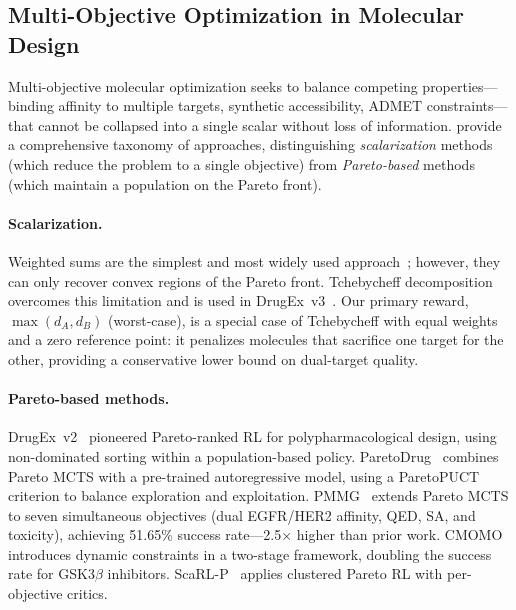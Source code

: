 \subsection{Multi-Objective Optimization in Molecular Design}
\label{sec:rw:moo}

Multi-objective molecular optimization seeks to balance competing
properties---binding affinity to multiple targets, synthetic accessibility,
ADMET constraints---that cannot be collapsed into a single scalar without
loss of information.
\citet{fromer2023moo} provide a comprehensive taxonomy of approaches,
distinguishing \emph{scalarization} methods (which reduce the problem to
a single objective) from \emph{Pareto-based} methods (which maintain a
population on the Pareto front).

\paragraph{Scalarization.}
Weighted sums are the simplest and most widely used
approach~\citep{loeffler2024reinvent4, liu2023drugexv3}; however, they
can only recover convex regions of the Pareto front.
Tchebycheff decomposition~\citep{zhang2007moead} overcomes this limitation
and is used in DrugEx~v3~\citep{liu2023drugexv3}.
Our primary reward, $\max(d_A, d_B)$ (worst-case), is a special case of
Tchebycheff with equal weights and a zero reference point: it penalizes
molecules that sacrifice one target for the other, providing a
conservative lower bound on dual-target quality.

\paragraph{Pareto-based methods.}
DrugEx~v2~\citep{liu2021drugex} pioneered Pareto-ranked RL for
polypharmacological design, using non-dominated sorting within a
population-based policy.
ParetoDrug~\citep{paretodrug2024} combines Pareto MCTS with a pre-trained
autoregressive model, using a ParetoPUCT criterion to balance exploration
and exploitation.
PMMG~\citep{pmmg2025} extends Pareto MCTS to seven simultaneous
objectives (dual EGFR/HER2 affinity, QED, SA, and toxicity), achieving
51.65\% success rate---2.5$\times$ higher than prior work.
CMOMO~\citep{cmomo2025} introduces dynamic constraints in a two-stage
framework, doubling the success rate for GSK3$\beta$ inhibitors.
ScaRL-P~\citep{wang2024scarlp} applies clustered Pareto RL with
per-objective critics.


